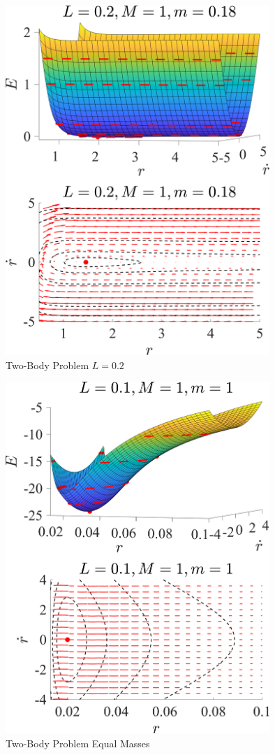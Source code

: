 \documentclass[11pt]{article}
\begin{document}
\begin{figure}[h]
\centering
\includegraphics[width=10cm]{2 Body Problem Big L.png}
\caption{Two-Body Problem $L = 0.2$}
\label{twobigL}
\end{figure}

\begin{figure}[h]
\centering
\includegraphics[width=10cm]{2 Body Problem Equal Masses.png}
\caption{Two-Body Problem Equal Masses}
\label{twoEqM}
\end{figure}
\end{document}
